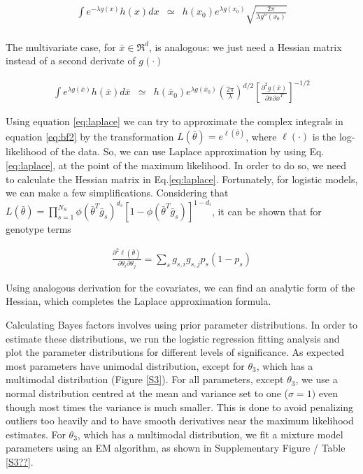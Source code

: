\begin{eqnarray*}
	\int{e^{-\lambda g(x)} h(x) dx} & \simeq & h(x_0) e^{\lambda g(x_0)} \sqrt{\frac{2 \pi}{\lambda g''(x_0)}} \\
\end{eqnarray*}

The multivariate case, for $\bar{x} \in \Re^d$, is analogous: we just need a Hessian matrix instead of a second derivate of $g(\cdot)$

\begin{eqnarray}\label{eq:laplace}
	\int{e^{\lambda g(\bar{x})} h(\bar{x}) d\bar{x}} & \simeq & h(\bar{x}_0) e^{\lambda g(\bar{x}_0)} 
	\left( \frac{2 \pi}{\lambda} \right)^{d/2} \left[ \frac{\partial^2 g(\bar{x}) }{\partial \bar{x} \partial \bar{x}^T} \right] ^{-1/2}
\end{eqnarray}

Using equation \ref{eq:laplace} we can try to approximate the complex integrals in equation \ref{eq:bf2} by the transformation $L(\bar{\theta}) = e^{\ell(\bar{\theta})}$, where $\ell(\cdot)$ is the log-likelihood of the data. So, we can use Laplace approximation by using Eq.\ref{eq:laplace}, at the point of the maximum likelihood. In order to do so, we need to calculate the Hessian matrix in Eq.\ref{eq:laplace}. Fortunately, for logistic models, we can make a few simplifications. Considering that $L(\bar{\theta}) = \prod_{s=1}^{N_S}{ \phi( \bar{\theta}^T \bar{g}_s)^{d_s} [ 1-\phi( \bar{\theta}^T \bar{g}_s) ]^{1-d_i} }$, it can be shown that for genotype terms

\begin{eqnarray*}
	\frac{ \partial^2 \ell(\bar{\theta}) }{ \partial\theta_i \partial\theta_j } 
	= \sum_s{ g_{s,i} g_{s,j} p_s (1-p_s) } 
\end{eqnarray*}

Using analogous derivation for the covariates, we can find an analytic form of the Hessian, which completes the Laplace approximation formula.

Calculating Bayes factors involves using prior parameter distributions. In order to estimate these distributions, we run the logistic regression fitting analysis and plot the parameter distributions for different levels of significance. As expected most parameters have unimodal distribution, except for $\theta_3$, which has a multimodal distribution (Figure \ref{S3}). For all parameters, except $\theta_3$, we use a normal distribution centred at the mean and variance set to one ($\sigma=1)$ even though most times the variance is much smaller. This is done to avoid penalizing outliers too heavily and to have smooth derivatives near the maximum likelihood estimates. For $\theta_3$, which has a multimodal distribution, we fit a mixture model parameters using an EM algorithm, as shown in Supplementary Figure / Table \ref{S3??}.


